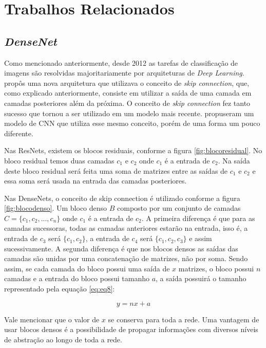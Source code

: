 \chapter{Trabalhos Relacionados}
\label{cap:3}
\vspace{-1.9cm}

\section{\textit{\ac{DenseNet}}}

Como mencionado anteriormente, desde 2012 as tarefas de classificação de imagens são resolvidas majoritariamente por arquiteturas de \textit{Deep Learning}.  propôs uma nova arquitetura que utilizava o conceito de \textit{skip connection}, que, como explicado anteriormente, consiste em utilizar a saída de uma camada em camadas posteriores além da próxima. O conceito de \textit{skip connection} fez tanto sucesso que tornou a ser utilizado em um modelo mais recente. \cite{liu-2017} propuseram um modelo de \ac{CNN} que utiliza esse mesmo conceito, porém de uma forma um pouco diferente. 

Nas \ac{ResNet}s, existem os blocos residuais, conforme a figura \ref{fig:blocoresidual}. No bloco residual temos duas camadas $c_1$ e $c_2$ onde $c_1$ é a entrada de $c_2$. Na saída deste bloco residual será feita uma soma de matrizes entre as saídas de $c_1$ e $c_2$ e essa soma será usada na entrada das camadas posteriores. 

Nas \ac{DenseNet}s, o conceito de skip connection é utilizado conforme a figura \ref{fig:blocodenso}. Um bloco denso $B$ composto por um conjunto de camadas $C = \{c_1, c_2, ..., c_n\}$ onde $c_1$ é a entrada de $c_2$. A primeira diferença é que para as camadas sucessoras, todas as camadas anteriores estarão na entrada, isso é, a entrada de $c_3$ será $\{c_1, c_2\}$, a entrada de $c_4$ será $\{c_1, c_2,c_3\}$ e assim sucessivamente. A segunda diferença é que nos blocos densos as saídas das camadas são unidas por uma concatenação de matrizes, não por soma. Sendo assim, se cada camada do bloco possui uma saída de $x$ matrizes, o bloco possui $n$ camadas e a entrada do bloco possui tamanho $a$, a saída possuirá o tamanho representado pela equação \ref{eq:eq8}:

\begin{equation}
	\label{eq:eq8}	y = n x + a
\end{equation}

Vale mencionar que o valor de $x$ se conserva para toda a rede. Uma vantagem de usar blocos densos é a possibilidade de propagar informações com diversos níveis de abstração ao longo de toda a rede.


